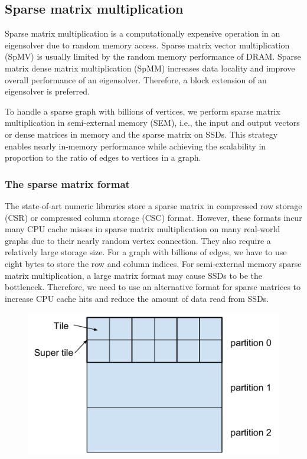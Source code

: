 \subsection{Sparse matrix multiplication} \label{spmm}
Sparse matrix multiplication is a computationally expensive
operation in an eigensolver due to random memory access. Sparse matrix vector
multiplication (SpMV) is usually limited by the random memory performance of
DRAM. Sparse matrix dense matrix multiplication (SpMM) increases data locality
and improve overall performance of an eigensolver. Therefore, a block extension
of an eigensolver is preferred.

To handle a sparse graph with billions of vertices, we perform sparse matrix
multiplication in semi-external memory (SEM),
i.e., the input and output vectors or dense matrices in memory and the sparse
matrix on SSDs. This strategy enables nearly in-memory performance while achieving
the scalability in proportion to the ratio of edges to vertices in a graph.

\subsubsection{The sparse matrix format}
The state-of-art numeric libraries store a sparse matrix in compressed row storage
(CSR) or compressed column storage (CSC) format. However, these formats incur
many CPU cache misses in sparse matrix multiplication on many real-world graphs
due to their nearly random vertex connection. They also require a relatively
large storage size. For a graph with billions of edges, we have to use eight
bytes to store the row and column indices. For semi-external memory sparse
matrix multiplication, a large matrix format may cause SSDs to be the bottleneck.
Therefore, we need to use an alternative format for sparse matrices to increase
CPU cache hits and reduce the amount of data read from SSDs.

\begin{figure}
\centering
\includegraphics[scale=0.3]{./sparse_mat.pdf}
\vspace{-5pt}
\caption{}
\vspace{-5pt}
\label{sparse_mat}
\end{figure}

